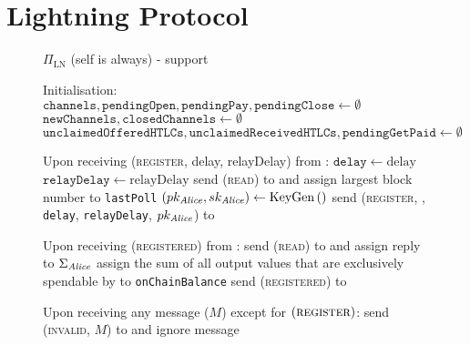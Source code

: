 \section{Lightning Protocol}
  \begin{figure}[H] %
    \begin{protocolbox}{$\Pi_{\mathrm{LN}}$ (self is \alice{} always) - support}
      \begin{algorithmic}[1]
        \State Initialisation:
        \Indent
          \State $\mathtt{channels}, \mathtt{pendingOpen}, \mathtt{pendingPay},
          \mathtt{pendingClose} \gets \emptyset$
          \State $\mathtt{newChannels}, \mathtt{closedChannels} \gets \emptyset$
          \State $\mathtt{unclaimedOfferedHTLCs},
          \mathtt{unclaimedReceivedHTLCs}, \mathtt{pendingGetPaid} \gets
          \emptyset$
        \EndIndent
        \Statex

        \State Upon receiving (\textsc{register}, delay, relayDelay) from
        \environment:
        \Indent
          \State $\mathtt{delay} \gets \mathrm{delay}$
          \label{alg:protocol:support:delay}
          \State $\mathtt{relayDelay} \gets \mathrm{relayDelay}$
          \State send (\textsc{read}) to \ledger{} and assign largest block
          number to \texttt{lastPoll}
          \label{alg:protocol:support:lastpoll}
          \State $\left(pk_{\mathit{Alice}}, sk_{\mathit{Alice}}\right) \gets
          \mathrm{KeyGen}\left(\right)$
          \label{alg:protocol:support:keygen}
          \State send (\textsc{register}, \alice, \texttt{delay},
          \texttt{relayDelay}, $pk_{\mathit{Alice}}$) to \environment
        \EndIndent
        \Statex

        \State Upon receiving (\textsc{registered}) from \environment:
        \Indent
          \State send (\textsc{read}) to \ledger{} and assign reply to
          $\Sigma_{\mathit{Alice}}$
          \State assign the sum of all output values that are exclusively
          spendable by \alice{} to \texttt{onChainBalance}
          \State send (\textsc{registered}) to \environment
        \EndIndent
        \Statex

        \State Upon receiving any message ($M$) except for
        $\left(\textsc{register}\right)$:
        \Indent
            \State send (\textsc{invalid}, $M$) to \environment{} and ignore
            message
          \EndIf
        \EndIndent
        \Statex


\end{algorithmic}
\end{protocolbox}
\end{figure}
